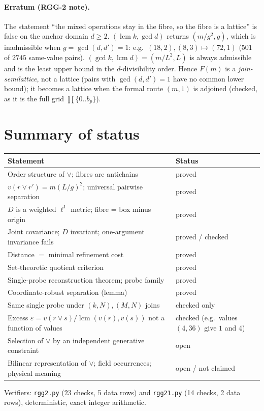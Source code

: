 \documentclass[11pt,a4paper]{article}
\theoremstyle{definition}
\newcommand{\lcm}{\operatorname{lcm}}
\newcommand{\vj}{\mathbin{\vee}}
\begin{document}
\paragraph{Erratum (RGG-2 note).} The statement ``the mixed operations stay in the fibre, so the fibre is a lattice'' is false on the anchor domain $d\ge2$. $(\lcm k,\gcd d)$ returns $(m/g^2,g)$, which is inadmissible when $g=\gcd(d,d')=1$: e.g.\ $(18,2),(8,3)\mapsto(72,1)$ ($501$ of $2745$ same-value pairs). $(\gcd k,\lcm d)=(m/L^2,L)$ is always admissible and is the least upper bound in the $d$-divisibility order. Hence $F(m)$ is a \emph{join-semilattice}, not a lattice (pairs with $\gcd(d,d')=1$ have no common lower bound); it becomes a lattice when the formal route $(m,1)$ is adjoined (checked, as it is the full grid $\prod\{0..b_p\}$).

\section{Summary of status}
\begin{center}\small
\begin{tabular}{@{}p{8.2cm}l@{}}\toprule
Statement & Status\\\midrule
Order structure of $\vj$; fibres are antichains & proved\\
$v(r\vj r')=m(L/g)^2$; universal pairwise separation & proved\\
$D$ is a weighted $\ell^1$ metric; fibre = box minus origin & proved\\
Joint covariance; $D$ invariant; one-argument invariance fails & proved / checked\\
Distance $=$ minimal refinement cost & proved\\
Set-theoretic quotient criterion & proved\\
Single-probe reconstruction theorem; probe family & proved\\
Coordinate-robust separation (lemma) & proved\\
Same single probe under $(k,N),(M,N)$ joins & checked only\\
Excess $\varepsilon=v(r\vj s)/\lcm(v(r),v(s))$ not a function of values & checked (e.g.\ values $(4,36)$ give $1$ and $4$)\\
Selection of $\vj$ by an independent generative constraint & open\\
Bilinear representation of $\vj$; field occurrences; physical meaning & open / not claimed\\\bottomrule
\end{tabular}
\end{center}
Verifiers: \texttt{rgg2.py} (23 checks, 5 data rows) and \texttt{rgg21.py} (14 checks, 2 data rows), deterministic, exact integer arithmetic.
\end{document}
